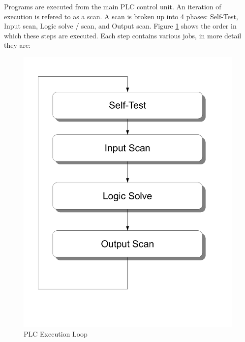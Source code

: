 \pagebreak
Programs are executed from the main PLC control unit. An iteration of execution is refered to as a scan. A scan is broken up into 4 phases: Self-Test, Input scan, Logic solve / scan, and Output scan. Figure \ref{fig:plcexecution} shows the order in which these steps are executed. Each step contains various jobs, in more detail they are:
\begin{figure}[htp]
    \centering
    \includegraphics[width=\imgmedphoto]{./images/plcexecution.pdf}
    \caption{PLC Execution Loop}
    \label{fig:plcexecution}
\end{figure}

